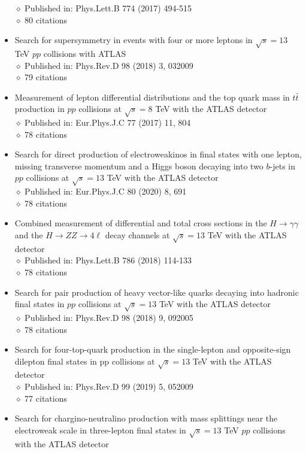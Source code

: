 \documentclass[margin, 10pt]{res} %
\begin{document}
\begin{resume}
\begin{itemize}
$\diamond$ Published in: Phys.Lett.B 774 (2017) 494-515\\
$\diamond$ 80 citations
\item Search for supersymmetry in events with four or more leptons in $\sqrt{s} = 13$ TeV $pp$ collisions with ATLAS\\
$\diamond$ Published in: Phys.Rev.D 98 (2018) 3, 032009\\
$\diamond$ 79 citations
\item Measurement of lepton differential distributions and the top quark mass in $t\bar{t}$ production in $pp$ collisions at $\sqrt{s} = 8$ TeV with the ATLAS detector\\
$\diamond$ Published in: Eur.Phys.J.C 77 (2017) 11, 804\\
$\diamond$ 78 citations
\item Search for direct production of electroweakinos in final states with one lepton, missing transverse momentum and a Higgs boson decaying into two $b$-jets in $pp$ collisions at $\sqrt{s} = 13$ TeV with the ATLAS detector\\
$\diamond$ Published in: Eur.Phys.J.C 80 (2020) 8, 691\\
$\diamond$ 78 citations
\item Combined measurement of differential and total cross sections in the $H \rightarrow \gamma \gamma$ and the $H \rightarrow ZZ \rightarrow 4\ell$ decay channels at $\sqrt{s} = 13$ TeV with the ATLAS detector\\
$\diamond$ Published in: Phys.Lett.B 786 (2018) 114-133\\
$\diamond$ 78 citations
\item Search for pair production of heavy vector-like quarks decaying into hadronic final states in $pp$ collisions at $\sqrt{s} = 13$ TeV with the ATLAS detector\\
$\diamond$ Published in: Phys.Rev.D 98 (2018) 9, 092005\\
$\diamond$ 78 citations
\item Search for four-top-quark production in the single-lepton and opposite-sign dilepton final states in pp collisions at $\sqrt{s} = 13$ TeV with the ATLAS detector\\
$\diamond$ Published in: Phys.Rev.D 99 (2019) 5, 052009\\
$\diamond$ 77 citations
\item Search for chargino-neutralino production with mass splittings near the electroweak scale in three-lepton final states in $\sqrt{s} = 13$ TeV $pp$ collisions with the ATLAS detector\\

\end{itemize}
\end{resume}
\end{document}
